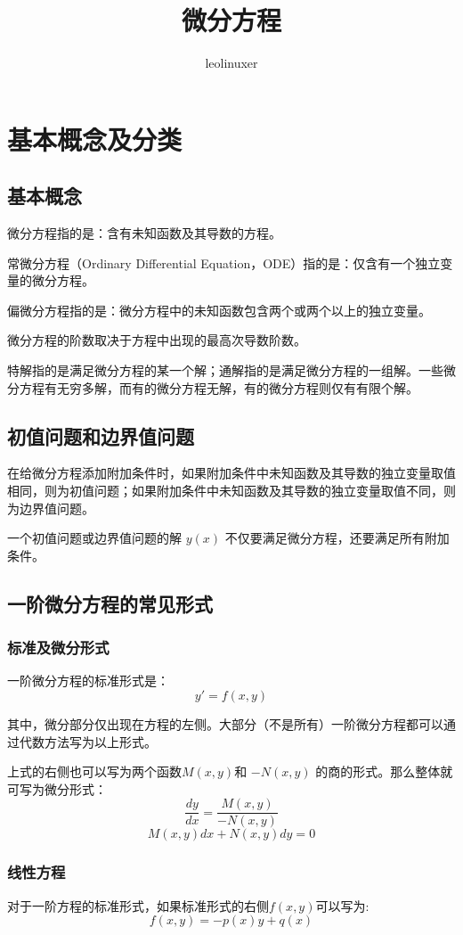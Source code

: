 \documentclass[12pt]{article}
\title{微分方程}
\author{leolinuxer}
\begin{document}
\maketitle
\section{基本概念及分类\cite{Differential_Equation_1_Basic}}
\subsection{基本概念}
微分方程指的是：含有未知函数及其导数的方程。

常微分方程（Ordinary Differential Equation，ODE）指的是：仅含有一个独立变量的微分方程。

偏微分方程指的是：微分方程中的未知函数包含两个或两个以上的独立变量。

微分方程的阶数取决于方程中出现的最高次导数阶数。

特解指的是满足微分方程的某一个解；通解指的是满足微分方程的一组解。一些微分方程有无穷多解，而有的微分方程无解，有的微分方程则仅有有限个解。

\subsection{初值问题和边界值问题}
在给微分方程添加附加条件时，如果附加条件中未知函数及其导数的独立变量取值相同，则为初值问题；如果附加条件中未知函数及其导数的独立变量取值不同，则为边界值问题。

一个初值问题或边界值问题的解 $y(x)$ 不仅要满足微分方程，还要满足所有附加条件。

\subsection{一阶微分方程的常见形式}
\subsubsection{标准及微分形式
}
一阶微分方程的标准形式是：
$$
y' = f(x,y)
$$

其中，微分部分仅出现在方程的左侧。大部分（不是所有）一阶微分方程都可以通过代数方法写为以上形式。

上式的右侧也可以写为两个函数$M(x,y)$和 $-N(x,y)$ 的商的形式。那么整体就可写为微分形式：
$$
\frac{dy}{dx} = \frac{M(x,y)}{-N(x,y)}
$$
$$
M(x,y)dx + N(x,y)dy = 0
$$

\subsubsection{线性方程}
对于一阶方程的标准形式，如果标准形式的右侧$f(x,y)$可以写为:
$$
f(x,y) = -p(x)y + q(x)
$$
\end{document}
